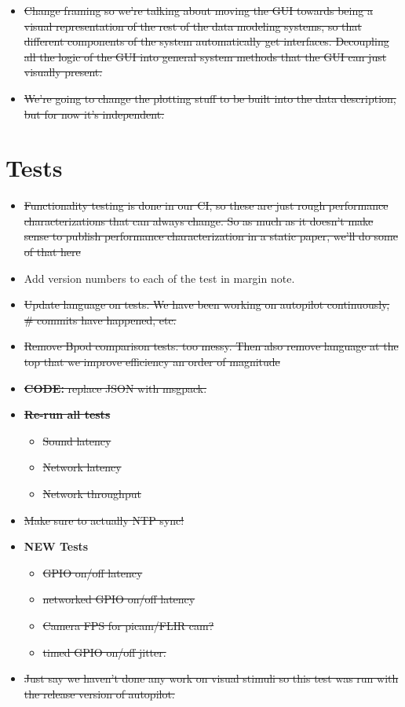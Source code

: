 \begin{itemize}
\item \sout{Change framing so we're talking about moving the GUI towards being a visual representation of the rest of the data modeling systems, so that different components of the system automatically get interfaces. Decoupling all the logic of the GUI into general system methods that the GUI can just visually present.}
\item \sout{We're going to change the plotting stuff to be built into the data description, but for now it's independent.}
\end{itemize}


\section{Tests}

\begin{itemize}
\item \sout{Functionality testing is done in our CI, so these are just rough performance characterizations that can always change. So as much as it doesn't make sense to publish performance characterization in a static paper, we'll do some of that here}
\item Add version numbers to each of the test in margin note.
\item \sout{Update language on tests. We have been working on autopilot continuously, \# commits have happened, etc.}
\item \sout{Remove Bpod comparison tests. too messy. Then also remove language at the top that we improve efficiency an order of magnitude}
\item \sout{\textbf{CODE:} replace JSON with msgpack.}
\item \sout{\textbf{Re-run all tests} }
\begin{itemize}
\item \sout{Sound latency}
\item \sout{Network latency}
\item \sout{Network throughput}
\end{itemize}
\item \sout{Make sure to actually NTP sync!}
\item \textbf{NEW Tests}
\begin{itemize}
\item \sout{GPIO on/off latency}
\item \sout{networked GPIO on/off latency}
\item \sout{Camera FPS for picam/FLIR cam?}
\item \sout{timed GPIO on/off jitter.}
\end{itemize}
\item \sout{Just say we haven't done any work on visual stimuli so this test was run with the release version of autopilot.}

\end{itemize}


